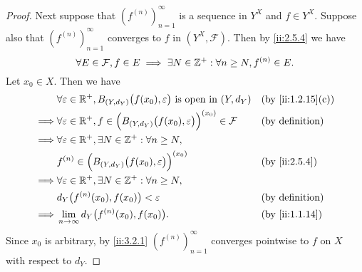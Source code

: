 \begin{proof}
  Next suppose that \((f^{(n)})_{n = 1}^\infty\) is a sequence in \(Y^X\) and \(f \in Y^X\).
  Suppose also that \((f^{(n)})_{n = 1}^\infty\) converges to \(f\) in \((Y^X, \mathcal{F})\).
  Then by \cref{ii:2.5.4} we have
  \[
    \forall E \in \mathcal{F}, f \in E \implies \exists N \in \mathbb{Z}^+ : \forall n \geq N, f^{(n)} \in E.
  \]
  Let \(x_0 \in X\).
  Then we have
  \begin{align*}
             & \forall \varepsilon \in \R^+, B_{(Y, d_Y)}\big(f(x_0), \varepsilon\big) \text{ is open in } (Y, d_Y)            &  & \by{ii:1.2.15}[c]         \\
    \implies & \forall \varepsilon \in \R^+, f \in \Big(B_{(Y, d_Y)}\big(f(x_0), \varepsilon\big)\Big)^{(x_0)} \in \mathcal{F} &  & \text{(by definition)} \\
    \implies & \forall \varepsilon \in \R^+, \exists N \in \Z^+ : \forall n \geq N,                                                                        \\
             & f^{(n)} \in \Big(B_{(Y, d_Y)}\big(f(x_0), \varepsilon\big)\Big)^{(x_0)}                                         &  & \by{ii:2.5.4}             \\
    \implies & \forall \varepsilon \in \R^+, \exists N \in \Z^+ : \forall n \geq N,                                                                        \\
             & d_Y\big(f^{(n)}(x_0), f(x_0)\big) < \varepsilon                                                                 &  & \text{(by definition)} \\
    \implies & \lim_{n \to \infty} d_Y\big(f^{(n)}(x_0), f(x_0)\big).                                                          &  & \by{ii:1.1.14}
  \end{align*}
  Since \(x_0\) is arbitrary, by \cref{ii:3.2.1} \((f^{(n)})_{n = 1}^\infty\) converges pointwise to \(f\) on \(X\) with respect to \(d_Y\).


\end{proof}
